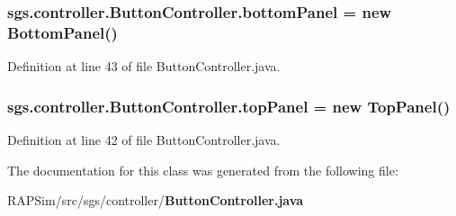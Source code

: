 \subsubsection[{bottom\-Panel}]{ sgs.\-controller.\-Button\-Controller.\-bottom\-Panel = new {\bf Bottom\-Panel}()}\label{classsgs_1_1controller_1_1_button_controller_a5657f82a32f7446c0d2f2c53c0b15a6a}


Definition at line 43 of file Button\-Controller.\-java.

\subsubsection[{top\-Panel}]{ sgs.\-controller.\-Button\-Controller.\-top\-Panel = new {\bf Top\-Panel}()}\label{classsgs_1_1controller_1_1_button_controller_ab5657e2e6b692ea7e1c46e68ef2ec5d0}


Definition at line 42 of file Button\-Controller.\-java.



The documentation for this class was generated from the following file\-:\begin{DoxyCompactItemize}
\item 
R\-A\-P\-Sim/src/sgs/controller/{\bf Button\-Controller.\-java}\end{DoxyCompactItemize}
